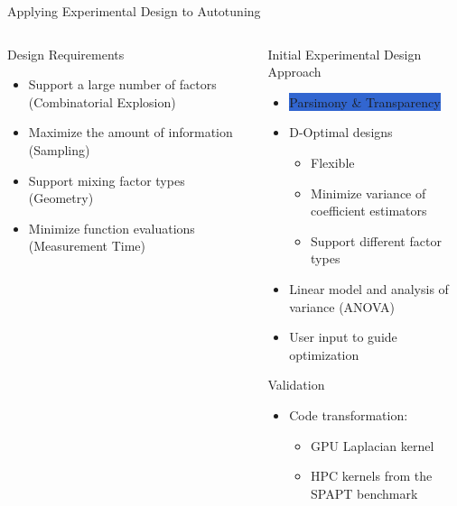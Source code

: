 \documentclass[10pt, compress, aspectratio=169, xcolor={table,usenames,dvipsnames}]{beamer}
\begin{document}
\begin{frame}[label={sec:orgcf85b26}]{Applying Experimental Design to Autotuning}
\begin{columns}
\begin{column}{0.45\columnwidth}
\begin{block}{Design Requirements}
\begin{itemize}
\item Support a large number of factors (\alert{Combinatorial Explosion})
\item Maximize the amount of information (\alert{Sampling})
\item Support mixing factor types (\alert{Geometry})
\item Minimize function evaluations (\alert{Measurement Time})
\end{itemize}
\end{block}
\end{column}

\begin{column}{0.55\columnwidth}
\begin{block}{Initial Experimental Design Approach}
\begin{itemize}
\item \colorbox{Highlight}{\alert{Parsimony} \& \alert{Transparency}}
\item \alert{D-Optimal} designs
\begin{itemize}
\item Flexible
\item Minimize variance of coefficient estimators
\item Support different factor types
\end{itemize}
\item \alert{Linear model} and analysis of variance (\alert{ANOVA})
\item User input to guide optimization
\end{itemize}

\begin{block}{Validation}
\begin{itemize}
\item Code transformation:
\begin{itemize}
\item GPU Laplacian kernel
\item HPC kernels from the SPAPT benchmark
\end{itemize}
\end{itemize}
\end{block}
\end{block}
\end{column}
\end{columns}
\end{frame}
\end{document}
